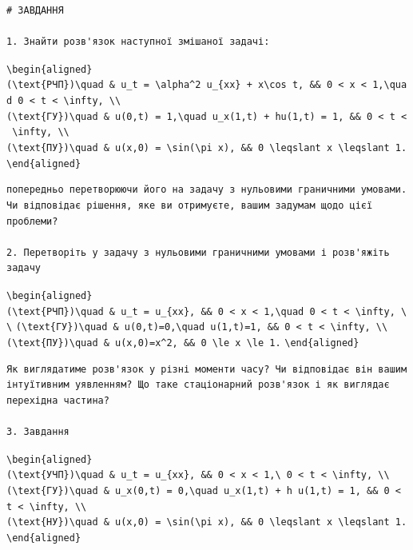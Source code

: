 \documentclass[
  ukrainian,
]{article}
\begin{document}
\begin{verbatim}
# ЗАВДАННЯ

1. Знайти розв'язок наступної змішаної задачі:
\end{verbatim}

\texttt{\textbackslash{}begin\{aligned\}}
\texttt{(\textbackslash{}text\{РЧП\})\textbackslash{}quad\ \&\ u\_t\ =\ \textbackslash{}alpha\^{}2\ u\_\{xx\}\ +\ x\textbackslash{}cos\ t,\ \&\&\ 0\ \textless{}\ x\ \textless{}\ 1,\textbackslash{}quad\ 0\ \textless{}\ t\ \textless{}\ \textbackslash{}infty,\ \textbackslash{}\textbackslash{}}
\texttt{(\textbackslash{}text\{ГУ\})\textbackslash{}quad\ \&\ u(0,t)\ =\ 1,\textbackslash{}quad\ u\_x(1,t)\ +\ hu(1,t)\ =\ 1,\ \&\&\ 0\ \textless{}\ t\ \textless{}\ \textbackslash{}infty,\ \textbackslash{}\textbackslash{}}
\texttt{(\textbackslash{}text\{ПУ\})\textbackslash{}quad\ \&\ u(x,0)\ =\ \textbackslash{}sin(\textbackslash{}pi\ x),\ \&\&\ 0\ \textbackslash{}leqslant\ x\ \textbackslash{}leqslant\ 1.}
\texttt{\textbackslash{}end\{aligned\}}

\begin{verbatim}
попередньо перетворюючи його на задачу з нульовими граничними умовами. Чи відповідає рішення, яке ви отримуєте, вашим задумам щодо цієї проблеми?

2. Перетворіть у задачу з нульовими граничними умовами і розв'яжіть задачу
\end{verbatim}

\texttt{\textbackslash{}begin\{aligned\}}
\texttt{(\textbackslash{}text\{РЧП\})\textbackslash{}quad\ \&\ u\_t\ =\ u\_\{xx\},\ \&\&\ 0\ \textless{}\ x\ \textless{}\ 1,\textbackslash{}quad\ 0\ \textless{}\ t\ \textless{}\ \textbackslash{}infty,\ \textbackslash{}\textbackslash{}}
\texttt{(\textbackslash{}text\{ГУ\})\textbackslash{}quad\ \&\ u(0,t)=0,\textbackslash{}quad\ u(1,t)=1,\ \&\&\ 0\ \textless{}\ t\ \textless{}\ \textbackslash{}infty,\ \textbackslash{}\textbackslash{}}
\texttt{(\textbackslash{}text\{ПУ\})\textbackslash{}quad\ \&\ u(x,0)=x\^{}2,\ \&\&\ 0\ \textbackslash{}le\ x\ \textbackslash{}le\ 1.}
\texttt{\textbackslash{}end\{aligned\}}

\begin{verbatim}
Як виглядатиме розв'язок у різні моменти часу? Чи відповідає він вашим інтуїтивним уявленням? Що таке стаціонарний розв'язок і як виглядає перехідна частина?

3. Завдання
\end{verbatim}

\texttt{\textbackslash{}begin\{aligned\}}
\texttt{(\textbackslash{}text\{УЧП\})\textbackslash{}quad\ \&\ u\_t\ =\ u\_\{xx\},\ \&\&\ 0\ \textless{}\ x\ \textless{}\ 1,\textbackslash{}\ 0\ \textless{}\ t\ \textless{}\ \textbackslash{}infty,\ \textbackslash{}\textbackslash{}}
\texttt{(\textbackslash{}text\{ГУ\})\textbackslash{}quad\ \&\ u\_x(0,t)\ =\ 0,\textbackslash{}quad\ u\_x(1,t)\ +\ h\ u(1,t)\ =\ 1,\ \&\&\ 0\ \textless{}\ t\ \textless{}\ \textbackslash{}infty,\ \textbackslash{}\textbackslash{}}
\texttt{(\textbackslash{}text\{НУ\})\textbackslash{}quad\ \&\ u(x,0)\ =\ \textbackslash{}sin(\textbackslash{}pi\ x),\ \&\&\ 0\ \textbackslash{}leqslant\ x\ \textbackslash{}leqslant\ 1.}
\texttt{\textbackslash{}end\{aligned\}}
\end{document}
